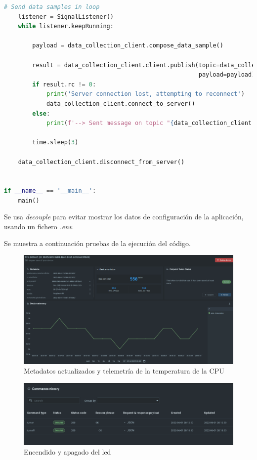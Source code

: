 {\begin{lstlisting}[language=Python]
    # Send data samples in loop
    listener = SignalListener()
    while listener.keepRunning:

        payload = data_collection_client.compose_data_sample()

        result = data_collection_client.client.publish(topic=data_collection_client.data_collection_topic,
                                                       payload=payload)
        if result.rc != 0:
            print('Server connection lost, attempting to reconnect')
            data_collection_client.connect_to_server()
        else:
            print(f'--> Sent message on topic "{data_collection_client.data_collection_topic}":\n{payload}')

        time.sleep(3)

    data_collection_client.disconnect_from_server()


if __name__ == '__main__':
    main()


\end{lstlisting}

Se usa \textit{decouple} para evitar mostrar los datos de configuración de la aplicación, usando un fichero \textit{.env}.

Se muestra a continuación pruebas de la ejecución del código.


\begin{figure}[p]
    \centering
    \includegraphics[width=\linewidth]{imagenes/data-execution.png}
    \caption{Metadatos actualizados y telemetría de la temperatura de la CPU}
    \label{fig:figure13}
\end{figure}

\begin{figure}[p]
    \centering
    \includegraphics[width=\linewidth]{imagenes/command-execution.png}
    \caption{Encendido y apagado del led}
    \label{fig:figure14}
\end{figure}

}
